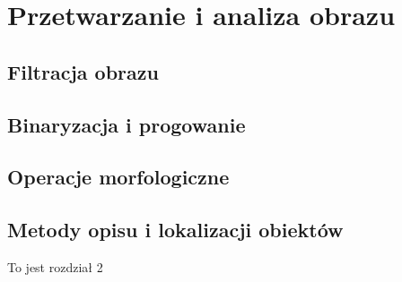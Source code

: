 \documentclass[document.tex]{subfiles}
\begin{document}
\chapter{Przetwarzanie i analiza obrazu}
\section{Filtracja obrazu}
\section{Binaryzacja i progowanie}
\section{Operacje morfologiczne}
\section{Metody opisu i lokalizacji obiektów}
To jest rozdział 2
\end{document}
